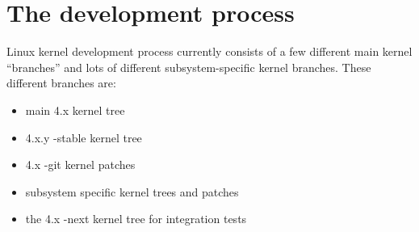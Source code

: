 \documentclass[a4paper,8pt,english]{sphinxmanual}
\begin{document}
\section{The development process}
\label{process/howto:the-development-process}
Linux kernel development process currently consists of a few different
main kernel ``branches'' and lots of different subsystem-specific kernel
branches.  These different branches are:
\begin{itemize}
\item {} 
main 4.x kernel tree

\item {} 
4.x.y -stable kernel tree

\item {} 
4.x -git kernel patches

\item {} 
subsystem specific kernel trees and patches

\item {} 
the 4.x -next kernel tree for integration tests

\end{itemize}
\end{document}
